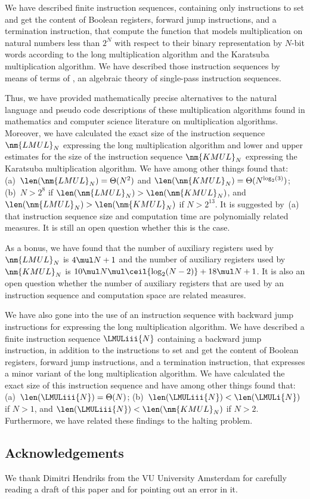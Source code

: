 \documentclass{llncs}
\begin{document}
We have described finite instruction sequences, containing only 
instructions to set and get the content of Boolean registers, forward 
jump instructions, and a termination instruction, that compute the 
function that models multiplication on natural numbers less than 
$2^N$ with respect to their binary representation by $N$-bit words
according to the long multiplication algorithm and the Karatsuba 
multiplication algorithm.
We have described those instruction sequences by means of terms of \PGA,
an algebraic theory of single-pass instruction sequences.

Thus, we have provided mathematically precise alternatives to the
natural language and pseudo code descriptions of these multiplication 
algorithms found in mathematics and computer science literature on 
multiplication algorithms.
Moreover, we have calculated the exact size of the instruction sequence 
$\nm{LMUL}_N$ expressing the long multiplication algorithm and lower and 
upper estimates for the size of the instruction sequence $\nm{KMUL}_N$ 
expressing the Karatsuba multiplication algorithm.
We have among other things found that: 
(a)~$\len(\nm{LMUL}_N) = \Theta(N^2)$ and
    $\len(\nm{KMUL}_N) = \Theta(N^{\log_2(3)})$; 
(b)~$N > 2^8$ if $\len(\nm{LMUL}_N) > \len(\nm{KMUL}_N)$, and
    $\len(\nm{LMUL}_N) > \len(\nm{KMUL}_N)$ if $N > 2^{13}$.
It is suggested by~(a) that instruction sequence size and computation 
time are polynomially related measures.
It is still an open question whether this is the case.

As a bonus, we have found that the number of auxiliary registers used by 
$\nm{LMUL}_N$ is $4 \mul N + 1$ and the number of auxiliary registers 
used by $\nm{KMUL}_N$ is 
$10 \mul N \mul \ceil{\log_2(N - 2)} + 18 \mul N + 1$.
It is also an open question whether the number of auxiliary registers 
that are used by an instruction sequence and computation space are 
related measures.

We have also gone into the use of an instruction sequence with backward 
jump instructions for expressing the long multiplication algorithm.
We have described a finite instruction sequence $\LMULiii{N}$ containing 
a backward jump instruction, in addition to the instructions to set and 
get the content of Boolean registers, forward jump instructions, and a 
termination instruction, that expresses a minor variant of the long 
multiplication algorithm.
We have calculated the exact size of this instruction sequence and have 
among other things found that:
(a)~$\len(\LMULiii{N}) = \Theta(N)$;
(b)~$\len(\LMULiii{N}) < \len(\LMULi{N})$ if $N > 1$, and 
    $\len(\LMULiii{N}) < \len(\nm{KMUL}_N)$ if $N > 2$.
Furthermore, we have related these findings to the halting problem.

\subsection*{Acknowledgements}
We thank Dimitri Hendriks from the VU University Amsterdam for carefully
reading a draft of this paper and for pointing out an error in it.



\end{document}
